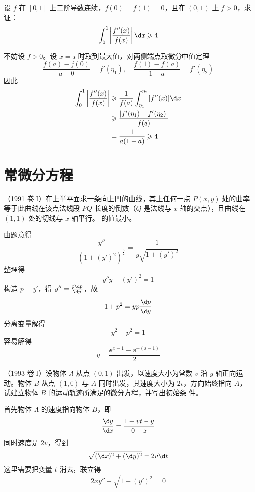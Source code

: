 \begin{problem}[000058]
设 $f$ 在 $[0, 1]$ 上二阶导数连续，$f(0) = f(1) = 0$，且在 $(0, 1)$ 上 $f > 0$，求证：
\[ \int_{0}^{1} \left|\frac{f''(x)}{f(x)}\right| \d x \geqslant 4 \]
\end{problem}

\begin{solution}
	不妨设 $f > 0$。设 $x = a$ 时取到最大值，对两侧端点取微分中值定理
	\[ \frac{f(a) - f(0)}{a - 0} = f'(\eta_1), \quad \frac{f(1) - f(a)}{1 - a} = f'(\eta_2) \]
	因此
	\[ \begin{aligned}
			\int_{0}^{1} \left|\frac{f''(x)}{f(x)}\right|
			 & \geqslant \frac{1}{f(a)} \int_{\eta_1}^{\eta_2} |f''(x)| \d x \\
			 & \geqslant \frac{|f'(\eta_1) - f'(\eta_2)|}{f(a)}              \\
			 & = \frac{1}{a(1-a)} \geqslant 4
		\end{aligned} \]
\end{solution}

\section{常微分方程}

\begin{problem}[000061]
（1991 卷 I）在上半平面求一条向上凹的曲线，其上任何一点 $P(x, y)$ 处的曲率等于此曲线在该点法线段 $PQ$ 长度的倒数（$Q$ 是法线与 $x$ 轴的交点），且曲线在 $(1, 1)$ 处的切线与 $x$ 轴平行。
的值最小。
\end{problem}

\begin{solution}
	由题意得
	\[ \frac{y''}{(1+(y')^2)^{\frac{3}{2}}} = \frac{1}{y \sqrt{1 + (y')^2}} \]
	整理得
	\[ y'' y - (y')^2 = 1 \]
	构造 $p = y'$，得 $y'' = \frac{p \d p}{\d y}$，故
	\[ 1 + p^2 = yp \frac{\d p}{\d y} \]
	分离变量解得
	\[ y^2 - p^2 = 1 \]
	容易解得
	\[ y = \frac{\ee^{x-1} - \ee^{-(x-1)}}{2} \]
\end{solution}

\begin{problem}[000063]
（1993 卷 I）设物体 $A$ 从点 $(0,1)$ 出发，以速度大小为常数 $v$ 沿 $y$ 轴正向运动。物体 $B$ 从点 $(1,0)$ 与 $A$ 同时出发，其速度大小为 $2v$，方向始终指向 $A$，试建立物体 $B$ 的运动轨迹所满足的微分方程，并写出初始条
件。
\end{problem}

\begin{solution}
	首先物体 $A$ 的速度指向物体 $B$，即
	\[ \frac{\d y}{\d x} = \frac{1 + vt - y}{0 - x} \]
	同时速度是 $2v$，得到
	\[ \sqrt{(\d x)^2 + (\d y)^2} = 2 v \d t \]
	这里需要把变量 $t$ 消去，联立得
	\[ 2 x y'' + \sqrt{1 + (y')^2} = 0 \]
\end{solution}

